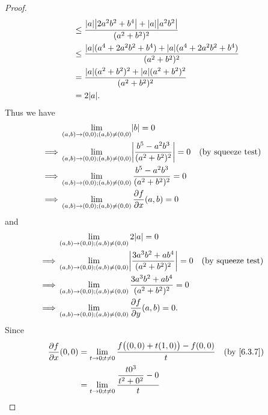 \begin{proof}
\begin{align*}
                                                   & \leq \dfrac{\abs{a} \abs{2 a^2 b^2 + b^4} + \abs{a} \abs{a^2 b^2}}{(a^2 + b^2)^2}             \\
                                                   & \leq \dfrac{\abs{a} (a^4 + 2 a^2 b^2 + b^4) + \abs{a} (a^4 + 2 a^2 b^2 + b^4)}{(a^2 + b^2)^2} \\
                                                   & = \dfrac{\abs{a} (a^2 + b^2)^2 + \abs{a} (a^2 + b^2)^2}{(a^2 + b^2)^2}                        \\
                                                   & = 2 \abs{a}.
  \end{align*}
  Thus we have
  \begin{align*}
             & \lim_{(a, b) \to (0, 0) ; (a, b) \neq (0, 0)} \abs{b} = 0                                                                  \\
    \implies & \lim_{(a, b) \to (0, 0) ; (a, b) \neq (0, 0)} \abs{\dfrac{b^5 - a^2 b^3}{(a^2 + b^2)^2}} = 0 &  & \text{(by squeeze test)} \\
    \implies & \lim_{(a, b) \to (0, 0) ; (a, b) \neq (0, 0)} \dfrac{b^5 - a^2 b^3}{(a^2 + b^2)^2} = 0                                     \\
    \implies & \lim_{(a, b) \to (0, 0) ; (a, b) \neq (0, 0)} \dfrac{\partial f}{\partial x}(a, b) = 0
  \end{align*}
  and
  \begin{align*}
             & \lim_{(a, b) \to (0, 0) ; (a, b) \neq (0, 0)} 2 \abs{a} = 0                                                                    \\
    \implies & \lim_{(a, b) \to (0, 0) ; (a, b) \neq (0, 0)} \abs{\dfrac{3 a^3 b^2 + a b^4}{(a^2 + b^2)^2}} = 0 &  & \text{(by squeeze test)} \\
    \implies & \lim_{(a, b) \to (0, 0) ; (a, b) \neq (0, 0)} \dfrac{3 a^3 b^2 + a b^4}{(a^2 + b^2)^2} = 0                                     \\
    \implies & \lim_{(a, b) \to (0, 0) ; (a, b) \neq (0, 0)} \dfrac{\partial f}{\partial y}(a, b) = 0.
  \end{align*}
  Since
  \begin{align*}
    \dfrac{\partial f}{\partial x}(0, 0) & = \lim_{t \to 0 ; t \neq 0} \dfrac{f\big((0, 0) + t(1, 0)\big) - f(0, 0)}{t} &  & \by{6.3.7} \\
                                         & = \lim_{t \to 0 ; t \neq 0} \dfrac{\dfrac{t 0^3}{t^2 + 0^2} - 0}{t}                          \\

\end{align*}
\end{proof}
